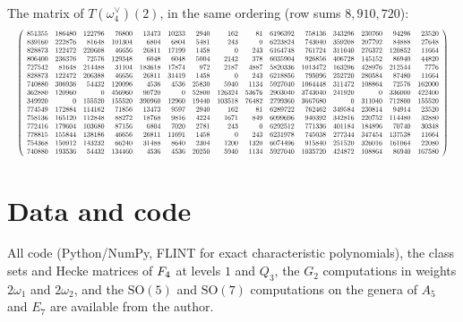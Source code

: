 \documentclass[11pt]{amsart}
\theoremstyle{definition}
\begin{document}
The matrix of $T(\omega_4^\vee)(2)$, in the same ordering (row sums $8{,}910{,}720$):
\[\resizebox{\textwidth}{!}{$\left(\begin{array}{rrrrrrrrrrrrrrr}
851355&186480&122796&76800&13473&10233&2940&162&81&6196392&758136&343296&230760&94296&23520\\
839160&222876&81648&101304&6804&6804&5481&243&0&6223824&743040&359208&207792&84888&27648\\
828873&122472&220608&46656&26811&17199&1458&0&243&6164748&761724&311040&276372&120852&11664\\
806400&236376&72576&129348&6048&6048&5004&2142&378&6035904&926856&406728&145152&86940&44820\\
727542&81648&214488&31104&183618&17874&972&2187&4887&5820336&1013472&163296&428976&212544&7776\\
828873&122472&206388&46656&26811&31419&1458&0&243&6218856&795096&252720&280584&87480&11664\\
740880&306936&54432&120096&4536&4536&25830&5940&1134&5927040&1064448&311472&108864&72576&162000\\
362880&120960&0&456960&90720&0&52800&126324&53676&2903040&3743040&241920&0&336000&422400\\
349920&0&155520&155520&390960&12960&19440&103518&76482&2799360&3667680&0&311040&712800&155520\\
774549&172884&114162&71856&13473&9597&2940&162&81&6289722&762462&349584&230814&94914&23520\\
758136&165120&112848&88272&18768&9816&4224&1671&849&6099696&940392&342816&220752&114480&32880\\
772416&179604&103680&87156&6804&7020&2781&243&0&6292512&771336&401184&184896&70740&30348\\
778815&155844&138186&46656&26811&11691&1458&0&243&6231978&745038&277344&347454&137538&11664\\
754368&150912&143232&66240&31488&8640&2304&1200&1320&6074496&915840&251520&326016&161064&22080\\
740880&193536&54432&134460&4536&4536&20250&5940&1134&5927040&1035720&424872&108864&86940&167580
\end{array}\right)$}\]

\section{Data and code}\label{app:data}
All code (Python/NumPy, FLINT for exact characteristic polynomials), the class sets and Hecke matrices of $F_4$ at levels $1$ and $Q_3$, the $G_2$ computations in weights $2\omega_1$ and $2\omega_2$, and the $\mathrm{SO}(5)$ and $\mathrm{SO}(7)$ computations on the genera of $A_5$ and $E_7$ are available from the author.
\end{document}

